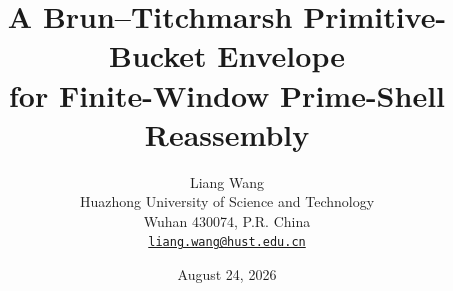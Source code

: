 \documentclass[11pt]{article}
\title{\textbf{A Brun--Titchmarsh Primitive-Bucket Envelope\\
for Finite-Window Prime-Shell Reassembly}}
\author{Liang Wang\\
\small Huazhong University of Science and Technology\\
\small Wuhan 430074, P.R. China\\
\small \href{mailto:liang.wang@hust.edu.cn}{\texttt{liang.wang@hust.edu.cn}}}
\date{August 24, 2026}
\theoremstyle{remark}
\begin{document}
\maketitle

\begin{abstract}

\end{abstract}












\end{document}
